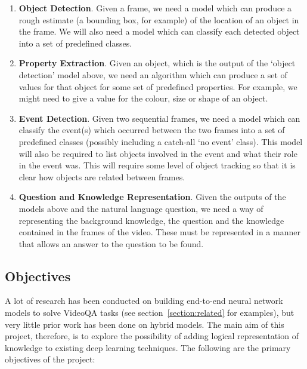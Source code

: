 \documentclass[../interim.tex]{subfiles}
\begin{document}
\begin{enumerate}
  \item \textbf{Object Detection}. Given a frame, we need a model which can produce a rough estimate (a bounding box, for example) of the location of an object in the frame. We will also need a model which can classify each detected object into a set of predefined classes.

  \item \textbf{Property Extraction}. Given an object, which is the output of the `object detection' model above, we need an algorithm which can produce a set of values for that object for some set of predefined properties. For example, we might need to give a value for the colour, size or shape of an object.

  \item \textbf{Event Detection}. Given two sequential frames, we need a model which can classify the event(s) which occurred between the two frames into a set of predefined classes (possibly including a catch-all `no event' class). This model will also be required to list objects involved in the event and what their role in the event was. This will require some level of object tracking so that it is clear how objects are related between frames.

  \item \textbf{Question and Knowledge Representation}. Given the outputs of the models above and the natural language question, we need a way of representing the background knowledge, the question and the knowledge contained in the frames of the video. These must be represented in a manner that allows an answer to the question to be found.
\end{enumerate}


\subsection{Objectives}

A lot of research has been conducted on building end-to-end neural network models to solve VideoQA tasks (see section~\ref{section:related} for examples), but very little prior work has been done on hybrid models. The main aim of this project, therefore, is to explore the possibility of adding logical representation of knowledge to existing deep learning techniques. The following are the primary objectives of the project:
\end{document}
